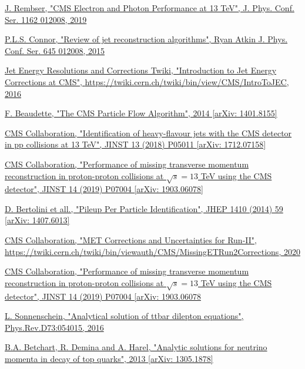 \documentclass[a4paper, 10pt, openright]{report}
\begin{document}
\begin{thebibliography}{1}
\href{https://iopscience.iop.org/article/10.1088/1742-6596/1162/1/012008/pdf}{J. Rembser,
"CMS Electron and Photon Performance at 13 TeV",
J. Phys. Conf. Ser. 1162 012008, 2019}

\href{https://iopscience.iop.org/article/10.1088/1742-6596/645/1/012008/pdf}{P.L.S. Connor,
"Review of jet reconstruction algorithms",
Ryan Atkin J. Phys. Conf. Ser. 645 012008, 2015}

\href{https://twiki.cern.ch/twiki/bin/view/CMS/IntroToJEC}{Jet Energy Resolutions and Corrections Twiki, "Introduction to Jet Energy Corrections at CMS", \url{https://twiki.cern.ch/twiki/bin/view/CMS/IntroToJEC},
2016}

\href{https://arxiv.org/abs/1401.8155}{F. Beaudette,
"The CMS Particle Flow Algorithm",
2014 [arXiv: 1401.8155]}

\href{https://arxiv.org/abs/1712.07158}{CMS Collaboration,
"Identification of heavy-flavour jets with the CMS detector in pp collisions at 13 TeV",
JINST 13 (2018) P05011 [arXiv: 1712.07158]}

\href{https://arxiv.org/abs/1903.06078}{CMS Collaboration,
"Performance of missing transverse momentum reconstruction in proton-proton collisions at $\sqrt{s} = 13$ TeV using the CMS detector",
JINST 14 (2019) P07004 [arXiv: 1903.06078]}

\href{https://arxiv.org/abs/1407.6013}{D. Bertolini et all.,
"Pileup Per Particle Identification", 
JHEP 1410 (2014) 59 [arXiv: 1407.6013]}

\href{https://twiki.cern.ch/twiki/bin/viewauth/CMS/MissingETRun2Corrections}{CMS Collaboration,
"MET Corrections and Uncertainties for Run-II", \url{https://twiki.cern.ch/twiki/bin/viewauth/CMS/MissingETRun2Corrections}, 2020}

\href{https://arxiv.org/abs/1903.06078}{CMS Collaboration,
"Performance of missing transverse momentum reconstruction in proton-proton collisions at $\sqrt{s} = 13$ TeV using the CMS detector",
JINST 14 (2019) P07004 [arXiv: 1903.06078}

\href{https://arxiv.org/abs/hep-ph/0603011}{L. Sonnenschein,
"Analytical solution of ttbar dilepton equations",
Phys.Rev.D73:054015, 2016}

\href{https://arxiv.org/pdf/1305.1878.pdf}{B.A. Betchart, R. Demina and A. Harel,
"Analytic solutions for neutrino momenta in decay of top quarks",
2013 [arXiv: 1305.1878]}


\end{thebibliography}
\end{document}
